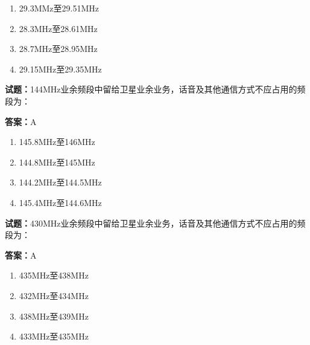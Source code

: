 \documentclass{ctexbook}
\begin{document}
\begin{enumerate}[leftmargin=3em]
  \item 29.3MMz至29.51MHz 

  \item 28.3MHz至28.61MHz 

  \item 28.7MHz至28.95MHz 

  \item 29.15MHz至29.35MHz 

\end{enumerate}





\vspace{1em}

\textbf{试题：}144MHz业余频段中留给卫星业余业务，话音及其他通信方式不应占用的频段为： 

\textbf{答案：}A 

\begin{enumerate}[leftmargin=3em]
  \item 145.8MHz至146MHz 

  \item 144.8MHz至145MHz 

  \item 144.2MHz至144.5MHz 

  \item 145.4MHz至144.6MHz 

\end{enumerate}





\vspace{1em}

\textbf{试题：}430MHz业余频段中留给卫星业余业务，话音及其他通信方式不应占用的频段为： 

\textbf{答案：}A 

\begin{enumerate}[leftmargin=3em]
  \item 435MHz至438MHz 

  \item 432MHz至434MHz 


  \item 438MHz至439MHz 

  \item 433MHz至435MHz 

\end{enumerate}
\end{document}
